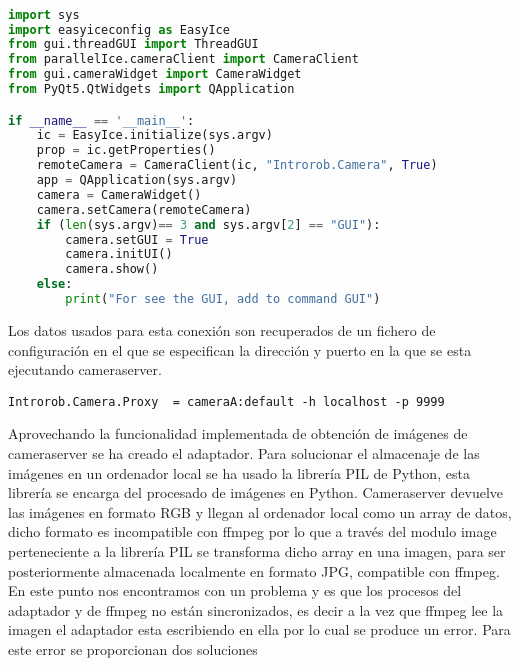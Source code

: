 \begin{lstlisting}[language=Python]

import sys
import easyiceconfig as EasyIce
from gui.threadGUI import ThreadGUI
from parallelIce.cameraClient import CameraClient
from gui.cameraWidget import CameraWidget
from PyQt5.QtWidgets import QApplication

if __name__ == '__main__':
    ic = EasyIce.initialize(sys.argv)
    prop = ic.getProperties()
    remoteCamera = CameraClient(ic, "Introrob.Camera", True)
    app = QApplication(sys.argv)
    camera = CameraWidget()
    camera.setCamera(remoteCamera)
    if (len(sys.argv)== 3 and sys.argv[2] == "GUI"):
        camera.setGUI = True
        camera.initUI()
        camera.show()
    else:
        print("For see the GUI, add to command GUI")


\end{lstlisting}

Los datos usados para esta conexión son recuperados de un fichero de configuración en el que se especifican la dirección y puerto en la que se esta ejecutando cameraserver.
\\
\begin{lstlisting}
Introrob.Camera.Proxy  = cameraA:default -h localhost -p 9999
\end{lstlisting}


Aprovechando la funcionalidad implementada de obtención de imágenes de cameraserver se ha creado el adaptador. Para solucionar el almacenaje de las imágenes en un ordenador local se ha usado la librería PIL de Python, esta librería se encarga del procesado de imágenes en Python. Cameraserver devuelve las imágenes en formato RGB y llegan al ordenador local como un array de datos, dicho formato es incompatible con ffmpeg por lo que a través del modulo image perteneciente a la librería PIL se transforma dicho array en una imagen, para ser posteriormente almacenada localmente en formato JPG, compatible con ffmpeg.
En este punto nos encontramos con un problema y es que los procesos del adaptador y de ffmpeg no están sincronizados, es decir a la vez que ffmpeg lee la imagen el adaptador esta escribiendo en ella por lo cual se produce un error. Para este error se proporcionan dos soluciones


